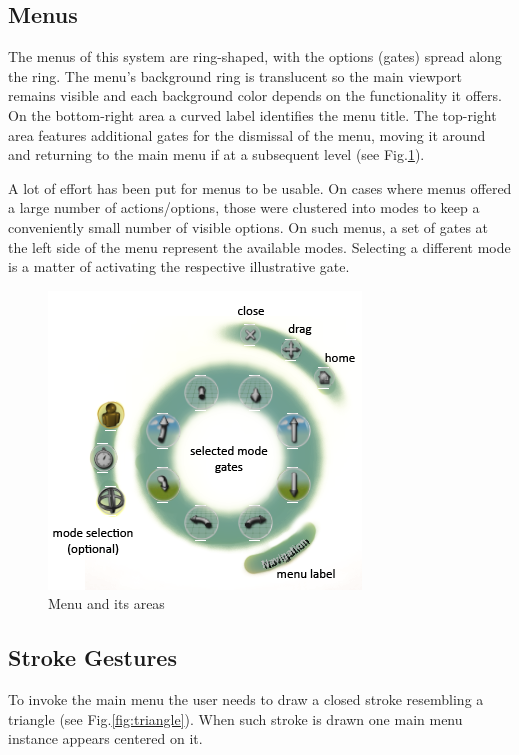 \subsection{Menus}

The menus of this system are ring-shaped, with the options (gates) spread along the ring.
The menu's background ring is translucent so the main viewport remains visible and each background color
depends on the functionality it offers.
On the bottom-right area a curved label identifies the menu title.
The top-right area features additional gates for the dismissal of the menu, moving it around and
returning to the main menu if at a subsequent level (see Fig.\ref{fig:menu}).

A lot of effort has been put for menus to be usable. On cases where menus offered a large number of actions/options,
those were clustered into modes to keep a conveniently small number of visible options.
On such menus, a set of gates at the left side of the menu represent the available modes.
Selecting a different mode is a matter of activating the respective illustrative gate.



\begin{figure}[ht]
	\centering
		\includegraphics[scale=0.75]{gfx/menu.png}
	\caption{Menu and its areas}
	\label{fig:menu}
\end{figure}




\subsection{Stroke Gestures}

To invoke the main menu the user needs to draw a closed stroke resembling a triangle (see Fig.\ref{fig:triangle}).
When such stroke is drawn one main menu instance appears centered on it.


